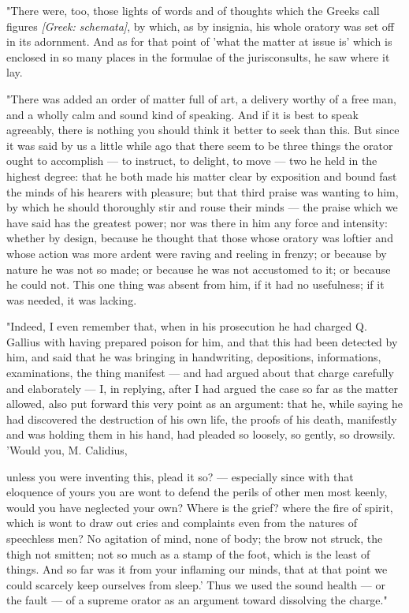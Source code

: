  "There were, too, those lights of words and of thoughts which the Greeks call figures \textit{[Greek: schemata]}, by which, as by insignia, his whole oratory was set off in its adornment. And as for that point of 'what the matter at issue is' which is enclosed in so many places in the formulae of the jurisconsults, he saw where it lay.

 "There was added an order of matter full of art, a delivery worthy of a free man, and a wholly calm and sound kind of speaking. And if it is best to speak agreeably, there is nothing you should think it better to seek than this. But since it was said by us a little while ago that there seem to be three things the orator ought to accomplish — to instruct, to delight, to move — two he held in the highest degree: that he both made his matter clear by exposition and bound fast the minds of his hearers with pleasure; but that third praise was wanting to him, by which he should thoroughly stir and rouse their minds — the praise which we have said has the greatest power; nor was there in him any force and intensity: whether by design, because he thought that those whose oratory was loftier and whose action was more ardent were raving and reeling in frenzy; or because by nature he was not so made; or because he was not accustomed to it; or because he could not. This one thing was absent from him, if it had no usefulness; if it was needed, it was lacking.

 "Indeed, I even remember that, when in his prosecution he had charged Q. Gallius with having prepared poison for him, and that this had been detected by him, and said that he was bringing in handwriting, depositions, informations, examinations, the thing manifest — and had argued about that charge carefully and elaborately — I, in replying, after I had argued the case so far as the matter allowed, also put forward this very point as an argument: that he, while saying he had discovered the destruction of his own life, the proofs of his death, manifestly and was holding them in his hand, had pleaded so loosely, so gently, so drowsily. 'Would you, M. Calidius,

 unless you were inventing this, plead it so? — especially since with that eloquence of yours you are wont to defend the perils of other men most keenly, would you have neglected your own? Where is the grief? where the fire of spirit, which is wont to draw out cries and complaints even from the natures of speechless men? No agitation of mind, none of body; the brow not struck, the thigh not smitten; not so much as a stamp of the foot, which is the least of things. And so far was it from your inflaming our minds, that at that point we could scarcely keep ourselves from sleep.' Thus we used the sound health — or the fault — of a supreme orator as an argument toward dissolving the charge."

